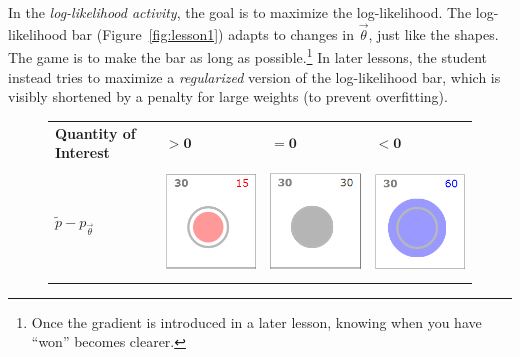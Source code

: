 \documentclass[11pt,letterpaper]{article}
\newcommand{\Note}[1]{}
\renewcommand{\Note}[1]{\hl{[#1]}}  %
\newcommand{\NoteSigned}[3]{{\sethlcolor{#2}\Note{#1: #3}}}
\newcommand{\NoteFF}[1]{\NoteSigned{FF}{LightBlue}{#1}}
\newcommand{\empirical}[0]{\ensuremath{\tilde{p}}}
\begin{document}
In the \textit{log-likelihood activity}, the goal is to maximize the
log-likelihood.  The log-likelihood bar (Figure~\ref{fig:lesson1})
adapts to changes in $\vec{\theta}$, just like the shapes. The game is
to make the bar as long as possible.\footnote{Once the gradient is
  introduced in a later lesson, knowing when you have ``won'' becomes
  clearer.}
In later lessons, the student instead tries to maximize a {\em regularized}
version of the log-likelihood bar, which is visibly shortened by a penalty for 
large weights (to prevent overfitting).

\begin{figure}[t]
\centering
\small
\begin{tabular}{
>{\centering\arraybackslash}m{} 
>{\centering\arraybackslash}m{}
>{\centering\arraybackslash}m{}
>{\centering\arraybackslash}m{}}

\textbf{Quantity of Interest} & $\mathbf{>0}$ 
& $\mathbf{= 0}$ & $\mathbf{<0}$\\ \\

$\empirical{} -p_{\vec{\theta}}$& \includegraphics[scale=.25]{images/goldilocks-circle-small.PNG}
& \includegraphics[scale=.25]{images/goldilocks-circle-justright.PNG}
& \includegraphics[scale=.25]{images/goldilocks-circle-large.PNG}\\ \\


\end{tabular}
\end{figure}
\end{document}
